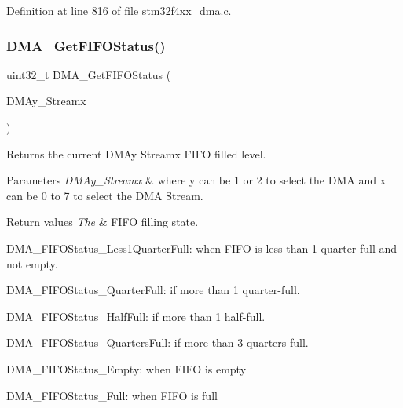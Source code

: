 Definition at line 816 of file stm32f4xx\+\_\+dma.\+c.

\mbox{\label{group___d_m_a_ga9893809a7067861ec111f7d712ebf28d}} 
\subsubsection{\texorpdfstring{D\+M\+A\+\_\+\+Get\+F\+I\+F\+O\+Status()}{DMA\_GetFIFOStatus()}}
{\footnotesize\ttfamily uint32\+\_\+t D\+M\+A\+\_\+\+Get\+F\+I\+F\+O\+Status (\begin{DoxyParamCaption}\item[{\hyperlink{struct_d_m_a___stream___type_def}{D\+M\+A\+\_\+\+Stream\+\_\+\+Type\+Def} $\ast$}]{D\+M\+Ay\+\_\+\+Streamx }\end{DoxyParamCaption})}



Returns the current D\+M\+Ay Streamx F\+I\+FO filled level. 


\begin{DoxyParams}{Parameters}
{\em D\+M\+Ay\+\_\+\+Streamx} & where y can be 1 or 2 to select the D\+MA and x can be 0 to 7 to select the D\+MA Stream. \\
\hline
\end{DoxyParams}

\begin{DoxyRetVals}{Return values}
{\em The} & F\+I\+FO filling state.
\begin{DoxyItemize}
\item D\+M\+A\+\_\+\+F\+I\+F\+O\+Status\+\_\+\+Less1\+Quarter\+Full\+: when F\+I\+FO is less than 1 quarter-\/full and not empty.
\item D\+M\+A\+\_\+\+F\+I\+F\+O\+Status\+\_\+Quarter\+Full\+: if more than 1 quarter-\/full.
\item D\+M\+A\+\_\+\+F\+I\+F\+O\+Status\+\_\+\+Half\+Full\+: if more than 1 half-\/full.
\item D\+M\+A\+\_\+\+F\+I\+F\+O\+Status\+\_\+Quarters\+Full\+: if more than 3 quarters-\/full.
\item D\+M\+A\+\_\+\+F\+I\+F\+O\+Status\+\_\+\+Empty\+: when F\+I\+FO is empty
\item D\+M\+A\+\_\+\+F\+I\+F\+O\+Status\+\_\+\+Full\+: when F\+I\+FO is full 
\end{DoxyItemize}\\
\hline
\end{DoxyRetVals}


